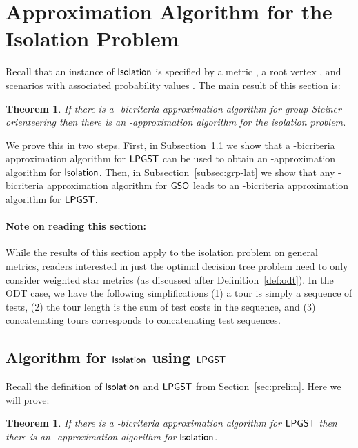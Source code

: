 \documentclass[11pt]{article}
\newtheorem{theorem}[thm]{Theorem}
\def\odt{{\sf ODT}\xspace}
\def\isoprob{\ensuremath{{\sf Isolation}}\xspace}
\def\lpgst{\ensuremath{{\sf LPGST}}\xspace}
\def\gso{\ensuremath{{\sf GSO}}\xspace}
\begin{document}
\section{Approximation Algorithm for the Isolation Problem} \label{sec:iso}



Recall that an instance of \isoprob is specified by a metric , a root vertex , and  scenarios
 with associated probability values . The main result of this section is:
\begin{theorem}\label{thm:isolation}
If there is a -bicriteria approximation algorithm for group Steiner orienteering then there is an -approximation algorithm for the isolation problem.
\end{theorem}

We prove this in two steps. First, in Subsection~\ref{subsec:iso-alg} we show that a -bicriteria approximation algorithm for \lpgst can be used to obtain an -approximation algorithm for \isoprob. Then, in Subsection~\ref{subsec:grp-lat} we show that any -bicriteria approximation algorithm for \gso leads to an -bicriteria approximation algorithm for \lpgst. 

\paragraph{Note on reading this section:} While the results of this section apply to the isolation problem on general metrics, 
readers interested in just the optimal decision tree problem need to only consider weighted star metrics (as discussed after Definition~\ref{def:odt}). In the \odt case, we have the following simplifications (1) a tour   is simply a sequence of tests, (2) the tour length is the sum of test costs in the  sequence, and (3) concatenating tours corresponds to concatenating test sequences. 

\subsection{Algorithm for \isoprob using \lpgst} \label{subsec:iso-alg}
Recall the definition of \isoprob and \lpgst from Section~\ref{sec:prelim}.  Here we will prove:
\begin{theorem}\label{thm:lpg-to-iso}
If there is a -bicriteria approximation algorithm for \lpgst then there is an -approximation algorithm for \isoprob.
\end{theorem}
\end{document}
